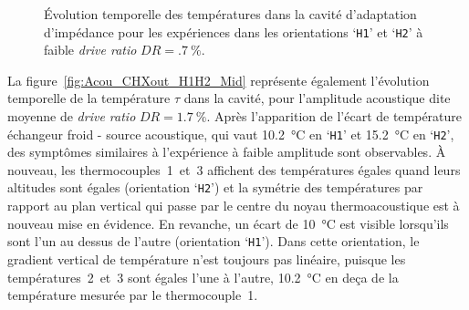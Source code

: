 
\begin{figure}[!ht]
    \centering
    
    \caption{\'Evolution temporelle des températures dans la cavité d'adaptation d'impédance pour les expériences dans les orientations `\texttt{H1}' et `\texttt{H2}' à faible \textit{drive ratio} $DR=\qty{.7}{\percent}$.}
    \label{fig:Acou_CHXout_H1H2_Low}
\end{figure}

La figure~\ref{fig:Acou_CHXout_H1H2_Mid} représente également l'évolution temporelle de la température $\tau$ dans la cavité, pour l'amplitude acoustique dite \og moyenne \fg{}  de \textit{drive ratio} $DR=\qty{1.7}{\percent}$. Après l'apparition de l'écart de température échangeur froid - source acoustique, qui vaut \qty{10.2}{\degreeCelsius} en `\texttt{H1}' et \qty{15.2}{\degreeCelsius} en `\texttt{H2}', des symptômes similaires à l'expérience à faible amplitude sont observables. À nouveau, les thermocouples~1~et~3 affichent des températures égales quand leurs altitudes sont égales (orientation `\texttt{H2}') et la symétrie des températures par rapport au plan vertical qui passe par le centre du noyau thermoacoustique est à nouveau mise en évidence. En revanche,  un écart de \qty{10}{\degreeCelsius} est visible lorsqu'ils sont l'un au dessus de l'autre (orientation `\texttt{H1}'). Dans cette orientation, le gradient vertical de température n'est toujours pas linéaire, puisque les températures~2~et~3 sont égales l'une à l'autre, \qty{10.2}{\degreeCelsius} en deça de la température mesurée par le thermocouple~1. 
\smallskip 

